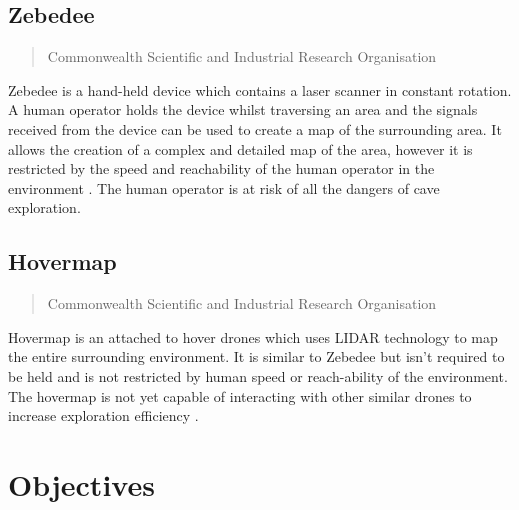 \documentclass{article}
\begin{document}
\subsection*{Zebedee}
\begin{quote}
    Commonwealth Scientific and Industrial Research Organisation
\end{quote}
Zebedee is a hand-held device which contains a laser scanner in constant rotation. A human operator holds the device whilst traversing an area and the signals received from the device can be used to create a map of the surrounding area. It allows the creation of a complex and detailed map of the area, however it is restricted by the speed and reachability of the human operator in the environment \cite{Zebedee}. The human operator is at risk of all the dangers of cave exploration.

\subsection*{Hovermap}
\begin{quote}
    Commonwealth Scientific and Industrial Research Organisation
\end{quote}
Hovermap is an attached to hover drones which uses LIDAR technology to map the entire surrounding environment. It is similar to Zebedee but isn't required to be held and is not restricted by human speed or reach-ability of the environment. The hovermap is not yet capable of interacting with other similar drones to increase exploration efficiency \cite{Hovermap}.

\section{Objectives}
\end{document}
